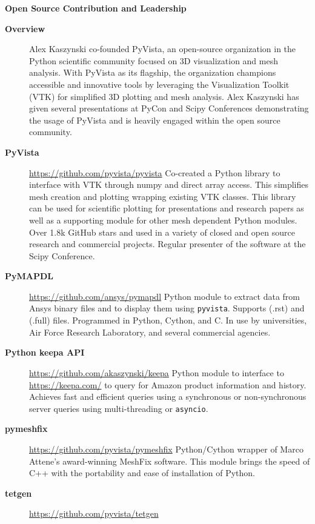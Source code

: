 \documentclass[letterpaper,11pt]{article}
\newcommand{\resheading}[1]{{\large \colorbox{mygrey}{\begin{minipage}{\textwidth}{\textbf{#1 \vphantom{p\^{E}}}}\end{minipage}}}}
\begin{document}
\resheading{Open Source Contribution and Leadership}

\begin{description}
\item[\textbf{Overview}] Alex Kaszynski co-founded PyVista, an open-source organization in the Python scientific community focused on 3D visualization and mesh analysis. With PyVista as its flagship, the organization champions accessible and innovative tools by leveraging the Visualization Toolkit (VTK) for simplified 3D plotting and mesh analysis. Alex Kaszynski has given several presentations at PyCon and Scipy Conferences demonstrating the usage of PyVista and is heavily engaged within the open source community.
\item[\textbf{PyVista}] \url{https://github.com/pyvista/pyvista} \newline
  Co-created a Python library to interface with VTK through numpy and direct array access. This simplifies mesh creation and plotting wrapping existing VTK classes. This library can be used for scientific plotting for presentations and research papers as well as a supporting module for other mesh dependent Python modules. Over 1.8k GitHub stars and used in a variety of closed and open source research and commercial projects. Regular presenter of the software at the Scipy Conference.
\item[\textbf{PyMAPDL}] \url{https://github.com/ansys/pymapdl} \newline
  Python module to extract data from Ansys binary files and to display them using \texttt{pyvista}. Supports (.rst) and (.full) files. Programmed in Python, Cython, and C. In use by universities, Air Force Research Laboratory, and several commercial agencies.
\item[\textbf{Python keepa API}] \url{https://github.com/akaszynski/keepa} \newline
Python module to interface to \url{https://keepa.com/} to query for Amazon product information and history. Achieves fast and efficient queries using a synchronous or non-synchronous server queries using multi-threading or \texttt{asyncio}.
\item[\textbf{pymeshfix}] \url{https://github.com/pyvista/pymeshfix} \newline
Python/Cython wrapper of Marco Attene's award-winning MeshFix software. This module brings the speed of C++ with the portability and ease of installation of Python.
\item[\textbf{tetgen}] \url{https://github.com/pyvista/tetgen} \newline

\end{description}
\end{document}
